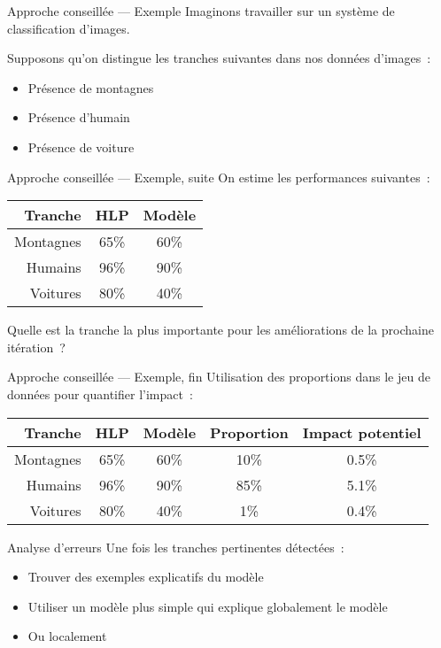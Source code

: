 \begin{frame}{Approche conseillée — Exemple}
  Imaginons travailler sur un système de classification d'images.

  Supposons qu'on distingue les tranches suivantes dans nos données d'images~:

  \begin{itemize}
    \item Présence de montagnes
    \item Présence d'humain
    \item Présence de voiture
  \end{itemize}
\end{frame}

\begin{frame}{Approche conseillée — Exemple, suite}
  On estime les performances suivantes~:

  \begin{tabular}{rcc}
    \toprule
    Tranche   & HLP  & Modèle \\
    \midrule
    Montagnes & 65\% & 60\%   \\
    Humains   & 96\% & 90\%   \\
    Voitures  & 80\% & 40\%   \\
    \bottomrule
  \end{tabular}

  Quelle est la tranche la plus importante pour les améliorations de la prochaine itération~?
\end{frame}

\begin{frame}{Approche conseillée — Exemple, fin}
  Utilisation des proportions dans le jeu de données pour quantifier l'impact~:

  \begin{tabular}{rcccc}
    \toprule
    Tranche   & HLP  & Modèle & Proportion & Impact potentiel \\
    \midrule
    Montagnes & 65\% & 60\%   & 10\%       & 0.5\% \\
    Humains   & 96\% & 90\%   & 85\%       & 5.1\% \\
    Voitures  & 80\% & 40\%   & 1\%        & 0.4\% \\
    \bottomrule
  \end{tabular}
\end{frame}

\begin{frame}{Analyse d'erreurs}
  Une fois les tranches pertinentes détectées~:

  \begin{itemize}
    \item Trouver des exemples explicatifs du modèle
    \item Utiliser un modèle plus simple qui explique globalement le modèle
    \item Ou localement
  \end{itemize}
\end{frame}


